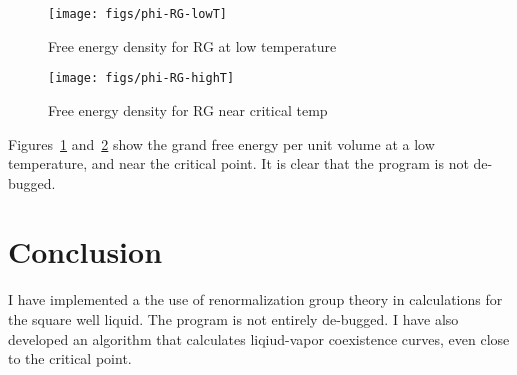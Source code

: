 \documentclass[letterpaper,twocolumn,amsmath,amssymb,prb]{revtex4-1}
\newcommand{\1}{\ensuremath{\textbf{r}_1}}
\newcommand{\2}{\ensuremath{\textbf{r}_2}}
\newcommand{\3}{\ensuremath{\textbf{r}_3}}
\newcommand{\4}{\ensuremath{\textbf{r}_4}}
\begin{document}
\begin{figure}
  \begin{center}
  \texttt{[image: figs/phi-RG-lowT]}
  \end{center}
  \caption{Free energy density for RG at low temperature}
  \label{fig:phi-RG-lowT}
\end{figure}

\begin{figure}
  \begin{center}
  \texttt{[image: figs/phi-RG-highT]}
  \end{center}
  \caption{Free energy density for RG near critical temp}
  \label{fig:phi-RG-highT}
\end{figure}

Figures~\ref{fig:phi-RG-lowT} and~\ref{fig:phi-RG-highT} show the
grand free energy per unit volume at a low temperature, and near the
critical point. It is clear that the program is not de-bugged.



\section{Conclusion}
I have implemented a the use of renormalization group theory in
calculations for the square well liquid. The program is not entirely
de-bugged. I have also developed an algorithm that calculates
liqiud-vapor coexistence curves, even close to the critical point.



\end{document}
